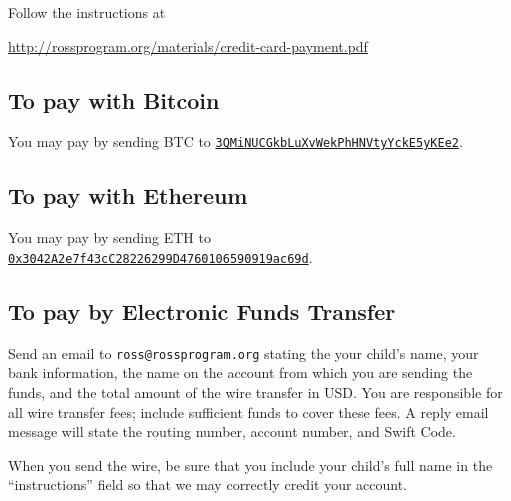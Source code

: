 \documentclass[11pt]{ross}
\begin{document}
Follow the instructions at
\begin{center}
\url{http://rossprogram.org/materials/credit-card-payment.pdf}
\end{center}

\subsection*{To pay with Bitcoin}

You may pay by sending BTC to \texttt{\href{bitcoin:3QMiNUCGkbLuXvWekPhHNVtyYckE5yKEe2}{3QMiNUCGkbLuXvWekPhHNVtyYckE5yKEe2}}.

\subsection*{To pay with Ethereum}

You may pay by sending ETH to \texttt{\href{ethereum:0x3042A2e7f43cC28226299D4760106590919ac69d}{0x3042A2e7f43cC28226299D4760106590919ac69d}}.

\subsection*{To pay by Electronic Funds Transfer}

Send an email to \texttt{ross@rossprogram.org} stating the your
child's name, your bank information, the name on the account from
which you are sending the funds, and the total amount of the wire
transfer in USD. You are responsible for all wire transfer fees;
include sufficient funds to cover these fees.  A reply email message
will state the routing number, account number, and Swift Code.

When you send the wire, be sure that you include your child's full
name in the ``instructions'' field so that we may correctly credit
your account.
\end{document}
